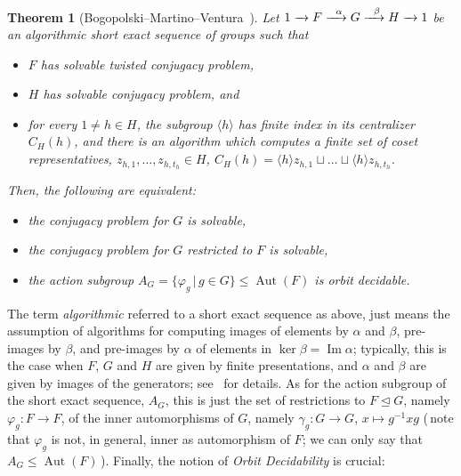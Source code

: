\documentclass[english]{amsart}
\newtheorem{thm}{Theorem}[section]
\theoremstyle{definition}
\newcommand{\Aut}{\operatorname{Aut}}
\begin{document}
\begin{thm}[Bogopolski--Martino--Ventura~\cite{BMV}] \label{thm: TCP to CP}
Let $1 \xrightarrow{\hspace{0.2 cm}} F \xrightarrow{\hspace{0.2 cm}\alpha} G \xrightarrow{\hspace{0.2 cm}\beta} H \xrightarrow{\hspace{0.2 cm}} 1$
be an algorithmic short exact sequence of groups such that
 \begin{itemize}
\item[(i)] $F$ has solvable twisted conjugacy problem,
\item[(ii)] $H$ has solvable conjugacy problem, and
\item[(iii)] for every $1\neq h\in H$, the subgroup $\langle h\rangle$ has finite index in its centralizer $C_H(h)$, and there is an algorithm which computes a finite set of coset representatives, $z_{h,1}, \ldots ,z_{h,t_h} \in H$, $C_H(h) =\langle h\rangle z_{h,1} \sqcup \ldots \sqcup \langle h\rangle z_{h,t_h}$.
 \end{itemize}
Then, the following are equivalent:
 \begin{itemize}
\item [(a)] the conjugacy problem for $G$ is solvable,
\item [(b)] the conjugacy problem for $G$ restricted to $F$ is solvable,
\item [(c)] the action subgroup $A_G = \{\varphi_g \, | \, g \in G \} \leqslant \Aut(F)$ is orbit decidable.
 \end{itemize}
\end{thm}

The term \emph{algorithmic} referred to a short exact sequence as above, just means the assumption of algorithms for computing images of elements by $\alpha$ and $\beta$, pre-images by $\beta$, and pre-images by $\alpha$ of elements in $\ker \beta =\operatorname{Im} \alpha$; typically, this is the case when $F$, $G$ and $H$ are given by finite presentations, and $\alpha$ and $\beta$ are given by images of the generators; see~\cite{BMV} for details. As for the action subgroup of the short exact sequence, $A_G$, this is just the set of restrictions to $F\unlhd G$, namely $\varphi_g \colon F\to F$, of the inner automorphisms of $G$, namely $\gamma_g \colon G\to G$, $x\mapsto g^{-1}xg$ (\,note that $\varphi_g$ is not, in general, inner as automorphism of $F$; we can only say that $A_G\leqslant \Aut(F)$\,). Finally, the notion of \emph{Orbit Decidability} is crucial: 
\end{document}
